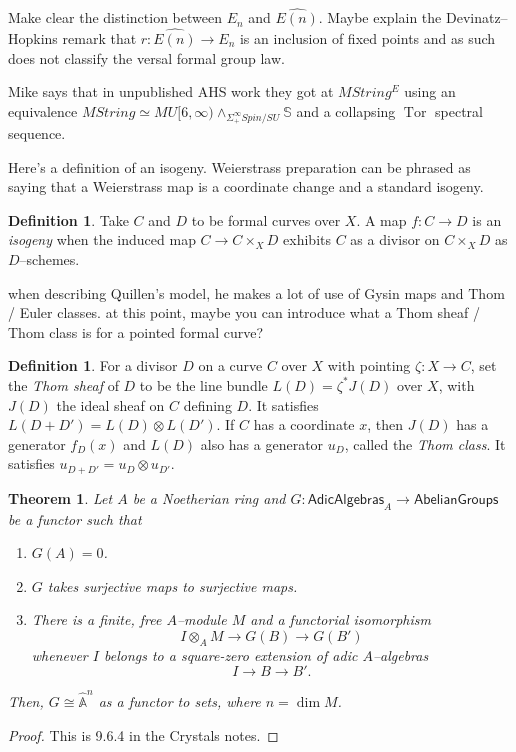 \documentclass[12pt]{book}
\renewcommand{\S}{\mathbb S}
\newcommand{\A}{\widehat{\mathbb{A}}}
\newcommand{\<}{\langle}
\renewcommand{\>}{\rangle}
\newcommand{\sm}{\wedge}
\newcommand{\Susp}{\Sigma}
\newcommand{\CatOf}[1]{\mathsf{#1}}
\newcommand{\Spin}{\mathit{Spin}}
\newcommand{\String}{\mathit{String}}
\DeclareMathOperator{\Tor}{Tor}
\numberwithin{equation}{section}
\theoremstyle{plain}
\newtheorem{theorem}[equation]{Theorem}
\theoremstyle{definition}
\newtheorem{definition}[equation]{Definition}
\theoremstyle{remark}
\begin{document}
Make clear the distinction between $E_n$ and $\widehat{E(n)}$. Maybe explain the Devinatz--Hopkins remark that $r: \widehat{E(n)} \to E_n$ is an inclusion of fixed points and as such does not classify the versal formal group law.

Mike says that in unpublished AHS work they got at $MString^E$ using an equivalence $M\String \simeq MU[6, \infty) \sm_{\Susp^\infty_+ \Spin/SU} \S$ and a collapsing $\Tor$ spectral sequence.

Here's a definition of an isogeny.  Weierstrass preparation can be phrased as saying that a Weierstrass map is a coordinate change and a standard isogeny.
\begin{definition}
Take $C$ and $D$ to be formal curves over $X$.  A map $f: C \to D$ is an \textit{isogeny} when the induced map $C \to C \times_X D$ exhibits $C$ as a divisor on $C \times_X D$ as $D$--schemes.
\end{definition}


when describing Quillen's model, he makes a lot of use of Gysin maps and Thom / Euler classes. at this point, maybe you can introduce what a Thom sheaf / Thom class is for a pointed formal curve?

\begin{definition}
For a divisor $D$ on a curve $C$ over $X$ with pointing $\zeta: X \to C$, set the \textit{Thom sheaf} of $D$ to be the line bundle $L(D) = \zeta^* J(D)$ over $X$, with $J(D)$ the ideal sheaf on $C$ defining $D$.  It satisfies $L(D + D') = L(D) \otimes L(D')$.  If $C$ has a coordinate $x$, then $J(D)$ has a generator $f_D(x)$ and $L(D)$ also has a generator $u_D$, called the \textit{Thom class}.  It satisfies $u_{D + D'} = u_D \otimes u_{D'}$.
\end{definition}




\begin{theorem}\label{DetectingFormalVarieties}
Let $A$ be a Noetherian ring and $G: \CatOf{AdicAlgebras}_A \to \CatOf{AbelianGroups}$ be a functor such that
\begin{enumerate}
\item $G(A) = 0$.
\item $G$ takes surjective maps to surjective maps.
\item There is a finite, free $A$--module $M$ and a functorial isomorphism \[I \otimes_A M \to G(B) \to G(B')\] whenever $I$ belongs to a square-zero extension of adic $A$--algebras \[I \to B \to B'.\]
\end{enumerate}
Then, $G \cong \A^n$ as a functor to sets, where $n = \dim M$.
\end{theorem}
\begin{proof}
This is 9.6.4 in the Crystals notes.
\end{proof}
\end{document}
